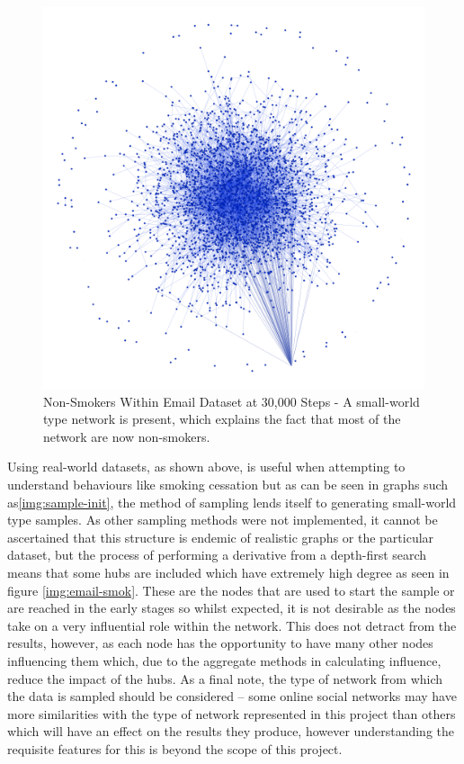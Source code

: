 \documentclass[]{report}
\begin{document}
\begin{figure}
\label{img:email-nonsmok}
\begin{center}
\includegraphics[scale=0.4]{email-nonsmok.png}
\end{center}
\caption{Non-Smokers Within Email Dataset at 30,000 Steps - A small-world type network is present, which explains the fact that most of the network are now non-smokers.}
\end{figure}

Using real-world datasets, as shown above, is useful when attempting to understand behaviours like smoking cessation but as can be seen in graphs such as\ref{img:sample-init}, the method of sampling lends itself to generating small-world type samples. As other sampling methods were not implemented, it cannot be ascertained that this structure is endemic of realistic graphs or the particular dataset, but the process of performing a derivative from a depth-first search means that some hubs are included which have extremely high degree as seen in figure \ref{img:email-smok}. These are the nodes that are used to start the sample or are reached in the early stages so whilst expected, it is not desirable as the nodes take on a very influential role within the network. This does not detract from the results, however, as each node has the opportunity to have many other nodes influencing them which, due to the aggregate methods in calculating influence, reduce the impact of the hubs. As a final note, the type of network from which the data is sampled should be considered – some online social networks may have more similarities with the type of network represented in this project than others which will have an effect on the results they produce, however understanding the requisite features for this is beyond the scope of this project.
\end{document}
